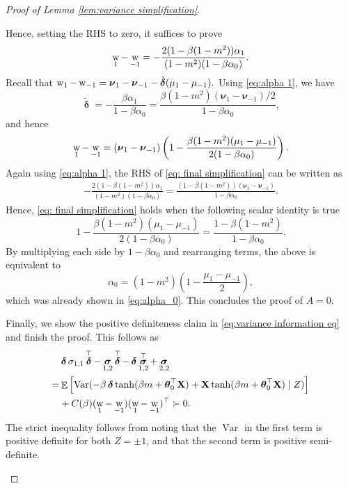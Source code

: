 \documentclass[preprint,reqno]{imsart}
\newcommand{\ttheta}{\boldsymbol{\theta}}
\DeclareMathOperator{\w}{{\mathnormal \mathbf{w}}}
\DeclareMathOperator{\ssigma}{\boldsymbol{\sigma}}
\DeclareMathOperator{\ddelta}{\boldsymbol{\delta}}
\DeclareMathOperator{\EE}{\mathbb{E}}
\DeclareMathOperator{\Var}{Var}
\newcommand{\X}{\mathbf{X}}
\begin{document}
\begin{appendix}
\begin{proof}[Proof of Lemma \ref{lem:variance simplification}]
\begin{enumerate}[(a)]
Hence, setting the RHS to zero, it suffices to prove 
\begin{align}
     \w_1-\w_{-1} = -\frac{2 (1-\beta(1-m^2)) \alpha_1}{(1-m^2) (1 - \beta \alpha_0)}. \label{eq: final simplification}
\end{align}
Recall that $\w_1 - \w_{-1} = \boldsymbol{\nu}_1 - \boldsymbol{\nu}_{-1} - \tilde{\ddelta} (\mu_1 - \mu_{-1}).$
Using \eqref{eq:alpha 1}, we have
$$\tilde{\ddelta} = - \frac{\beta \alpha_1}{1 - \beta \alpha_0} = \frac{\beta (1-m^2) (\boldsymbol{\nu}_1 - \boldsymbol{\nu}_{-1})/2}{1 - \beta \alpha_0},$$
and hence
\begin{align}
    \w_1 - \w_{-1} = (\boldsymbol{\nu}_1 - \boldsymbol{\nu}_{-1}) \left(1 - \frac{\beta (1-m^2) (\mu_1 - \mu_{-1})}{2(1 - \beta \alpha_0)} \right).
\end{align}
Again using \eqref{eq:alpha 1}, the RHS of \eqref{eq: final simplification} can be written as 
\begin{align*}
    -\frac{2 (1-\beta(1-m^2)) \alpha_1}{(1-m^2) (1 - \beta \alpha_0)} = \frac{(1 - \beta (1-m^2))(\boldsymbol{\nu}_1 - \boldsymbol{\nu}_{-1})}{1 - \beta \alpha_0}.
\end{align*}
Hence, \eqref{eq: final simplification} holds when the following scalar identity is true
$$ 1 - \frac{\beta (1-m^2) (\mu_1 - \mu_{-1})}{2(1 - \beta \alpha_0)} = \frac{1 - \beta (1-m^2)}{1 - \beta \alpha_0}.$$
By multiplying each side by $1-\beta \alpha_0$ and rearranging terms, the above is equivalent to
$$\alpha_0 = (1-m^2) (1 - \frac{\mu_1 - \mu_{-1}}{2}),$$
which was already shown in \eqref{eq:alpha_0}. This concludes the proof of $A=0$.
\vspace{2mm}

Finally, we show the positive definiteness claim in \eqref{eq:variance information eq} and finish the proof. This follows as
\begin{align*}
    &\ddelta \sigma_{1,1} \ddelta^{\top} - \ssigma_{1,2} \ddelta^{\top} - \ddelta \ssigma_{1,2}^{\top} + \ssigma_{2,2} \\
    =& \EE \left[ \Var (- \beta \ddelta \tanh(\beta m + \ttheta_0^\top \X) + \X \tanh(\beta m + \ttheta_0^\top \X) \mid Z) \right] \\
    &+ C(\beta) (\w_1 - \w_{-1})(\w_1 - \w_{-1})^\top \succ 0.
\end{align*}
The strict inequality follows from noting that the $\Var$ in the first term is positive definite for both $Z = \pm 1$, and that the second term is positive semi-definite.
\end{enumerate}
\end{proof}


\end{appendix}

%
%
%
%
%
%
%
%
%
%
%
%
%
%
%
\end{document}
